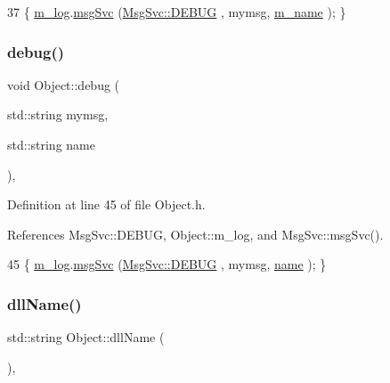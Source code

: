 \begin{DoxyCode}
37 \{ \hyperlink{classObject_a0d269813dd7ac1f24bc143031e2963f2}{m\_log}.\hyperlink{classMsgSvc_ad25f18047920cc59a314e5098259711c}{msgSvc} (\hyperlink{classMsgSvc_ae671eb7301996cd049d2da8a65925926a1dbdcc82dce88370ec335883c83b38b0}{MsgSvc::DEBUG}   , mymsg, \hyperlink{classObject_a8b83c95c705d2c3ba0d081fe1710f48d}{m\_name} ); \}
\end{DoxyCode}
\mbox{\label{classObject_a6c9a0397ca804e04d675ed05683f5420}} 
\subsubsection{\texorpdfstring{debug()}{debug()}\hspace{0.1cm}{\footnotesize\ttfamily [2/2]}}
{\footnotesize\ttfamily void Object\+::debug (\begin{DoxyParamCaption}\item[{std\+::string}]{mymsg,  }\item[{std\+::string}]{name }\end{DoxyParamCaption})\hspace{0.3cm}{\ttfamily [inline]}, {\ttfamily [inherited]}}



Definition at line 45 of file Object.\+h.



References Msg\+Svc\+::\+D\+E\+B\+UG, Object\+::m\+\_\+log, and Msg\+Svc\+::msg\+Svc().


\begin{DoxyCode}
45 \{ \hyperlink{classObject_a0d269813dd7ac1f24bc143031e2963f2}{m\_log}.\hyperlink{classMsgSvc_ad25f18047920cc59a314e5098259711c}{msgSvc} (\hyperlink{classMsgSvc_ae671eb7301996cd049d2da8a65925926a1dbdcc82dce88370ec335883c83b38b0}{MsgSvc::DEBUG}   , mymsg, \hyperlink{classObject_a300f4c05dd468c7bb8b3c968868443c1}{name} ); \}
\end{DoxyCode}
\mbox{\label{classObject_a2e3947f2870094c332d7454117f3ec63}} 
\subsubsection{\texorpdfstring{dll\+Name()}{dllName()}}
{\footnotesize\ttfamily std\+::string Object\+::dll\+Name (\begin{DoxyParamCaption}{ }\end{DoxyParamCaption})\hspace{0.3cm}{\ttfamily [inline]}, {\ttfamily [inherited]}}


